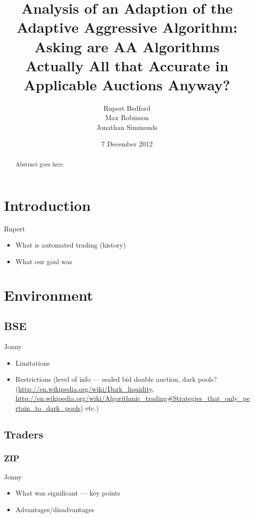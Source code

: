 \documentclass{acm_proc_article-sp}
\begin{document}
\title{Analysis of an Adaption of the Adaptive Aggressive Algorithm: Asking are AA Algorithms Actually All that Accurate in Applicable Auctions Anyway?}
\author{
  \alignauthor
    Rupert Bedford\\
  \alignauthor
    Max Robinson\\
  \alignauthor
    Jonathan Simmonds
}
\date{7 December 2012}

\maketitle
\begin{abstract}
Abstract goes here.
\end{abstract}

\pagebreak

\section{Introduction}
Rupert

\begin{itemize}
	\item What is automated trading (history)
	\item What our goal was
\end{itemize}


\section{Environment}
\subsection{BSE}
Jonny
\begin{itemize} \itemsep0pt
	\item Limitations
	\item Restrictions (level of info --- sealed bid double auction, dark pools? (\url{http://en.wikipedia.org/wiki/Dark_liquidity}, \url{http://en.wikipedia.org/wiki/Algorithmic_trading#Strategies_that_only_pertain_to_dark_pools}) etc.)
\end{itemize}

\subsection{Traders}
\subsubsection{ZIP}
Jonny
\begin{itemize} \itemsep0pt
	\item What was significant --- key points
	\item Advantages/disadvantages
\end{itemize}
\end{document}
